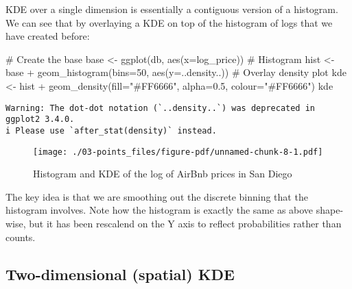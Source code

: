 \documentclass[
  letterpaper,
  krantz2]{style/krantz}
\newenvironment{Shaded}{\begin{snugshade}}{\end{snugshade}}
\newcommand{\AttributeTok}[1]{\textcolor[rgb]{0.40,0.45,0.13}{#1}}
\newcommand{\CommentTok}[1]{\textcolor[rgb]{0.37,0.37,0.37}{#1}}
\newcommand{\DecValTok}[1]{\textcolor[rgb]{0.68,0.00,0.00}{#1}}
\newcommand{\FloatTok}[1]{\textcolor[rgb]{0.68,0.00,0.00}{#1}}
\newcommand{\FunctionTok}[1]{\textcolor[rgb]{0.28,0.35,0.67}{#1}}
\newcommand{\NormalTok}[1]{\textcolor[rgb]{0.00,0.23,0.31}{#1}}
\newcommand{\OtherTok}[1]{\textcolor[rgb]{0.00,0.23,0.31}{#1}}
\newcommand{\SpecialCharTok}[1]{\textcolor[rgb]{0.37,0.37,0.37}{#1}}
\newcommand{\StringTok}[1]{\textcolor[rgb]{0.13,0.47,0.30}{#1}}
\begin{document}
KDE over a single dimension is essentially a contiguous version of a
histogram. We can see that by overlaying a KDE on top of the histogram
of logs that we have created before:

\begin{Shaded}
\begin{Highlighting}[]
\CommentTok{\# Create the base}
\NormalTok{base }\OtherTok{\textless{}{-}} \FunctionTok{ggplot}\NormalTok{(db, }\FunctionTok{aes}\NormalTok{(}\AttributeTok{x=}\NormalTok{log\_price))}
\CommentTok{\# Histogram}
\NormalTok{hist }\OtherTok{\textless{}{-}}\NormalTok{ base }\SpecialCharTok{+} 
  \FunctionTok{geom\_histogram}\NormalTok{(}\AttributeTok{bins=}\DecValTok{50}\NormalTok{, }\FunctionTok{aes}\NormalTok{(}\AttributeTok{y=}\NormalTok{..density..))}
\CommentTok{\# Overlay density plot}
\NormalTok{kde }\OtherTok{\textless{}{-}}\NormalTok{ hist }\SpecialCharTok{+} 
  \FunctionTok{geom\_density}\NormalTok{(}\AttributeTok{fill=}\StringTok{"\#FF6666"}\NormalTok{, }\AttributeTok{alpha=}\FloatTok{0.5}\NormalTok{, }\AttributeTok{colour=}\StringTok{"\#FF6666"}\NormalTok{)}
\NormalTok{kde}
\end{Highlighting}
\end{Shaded}

\begin{verbatim}
Warning: The dot-dot notation (`..density..`) was deprecated in ggplot2 3.4.0.
i Please use `after_stat(density)` instead.
\end{verbatim}

\begin{figure}[H]

{\centering \texttt{[image: ./03-points\_files/figure-pdf/unnamed-chunk-8-1.pdf]}

}

\caption{Histogram and KDE of the log of AirBnb prices in San Diego}

\end{figure}

The key idea is that we are smoothing out the discrete binning that the
histogram involves. Note how the histogram is exactly the same as above
shape-wise, but it has been rescalend on the Y axis to reflect
probabilities rather than counts.

\hypertarget{two-dimensional-spatial-kde}{%
\subsection{Two-dimensional (spatial)
KDE}\label{two-dimensional-spatial-kde}}
\end{document}
